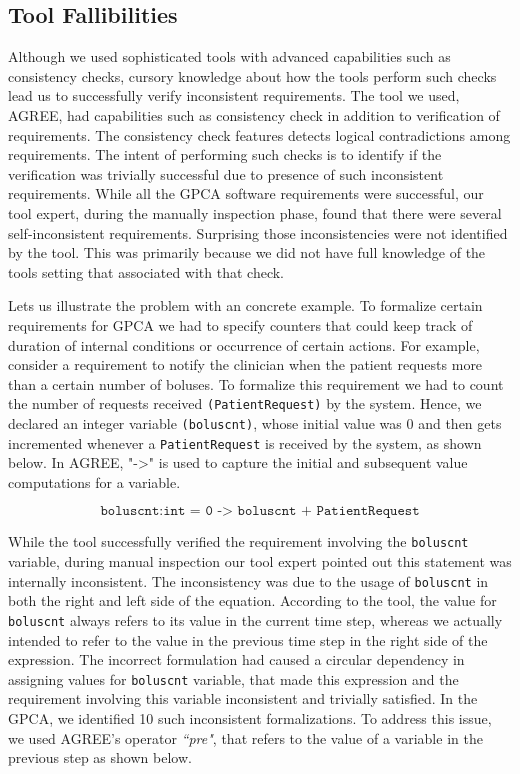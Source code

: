 \subsection{Tool Fallibilities}

Although we used sophisticated tools with advanced capabilities such as consistency checks, cursory knowledge about how the tools perform such checks lead us to successfully verify inconsistent requirements. The tool we used, AGREE, had capabilities such as consistency check in addition to verification of requirements. The consistency check features detects logical contradictions among requirements. The intent of performing such checks is to identify if the verification was trivially successful due to presence of such inconsistent requirements. While all the GPCA software requirements were successful, our tool expert, during the manually inspection phase, found that there were several self-inconsistent requirements. Surprising those inconsistencies were not identified by the tool. This was primarily because we did not have full knowledge of the tools setting that associated with that check.

Lets us illustrate the problem with an concrete example. To formalize certain requirements for GPCA we had to specify counters that could keep track of duration of internal conditions or occurrence of certain actions. For example, consider a requirement to notify the clinician when the patient requests more than a certain number of boluses. To formalize this requirement we had to count the number of requests received \texttt{(PatientRequest)} by the system. Hence, we declared an integer variable \texttt{(boluscnt)}, whose initial value was 0 and then gets incremented whenever a \texttt{PatientRequest} is received by the system, as shown below. In AGREE, "->" is used to capture the initial and subsequent value computations for a variable.

$$ \texttt{boluscnt:int = 0 -> boluscnt + PatientRequest} $$

While the tool successfully verified the requirement involving the \texttt{boluscnt} variable, during manual inspection our tool expert pointed out this statement was internally inconsistent. The inconsistency was due to the usage of \texttt{boluscnt} in both the right and left side of the equation. According to the tool, the value for \texttt{boluscnt} always refers to its value in the current time step, whereas we actually intended to refer to the value in the previous time step in the right side of the expression. The incorrect formulation had caused a circular dependency in assigning values for \texttt{boluscnt} variable, that made this expression and the requirement involving this variable inconsistent and trivially satisfied. In the GPCA, we identified 10 such inconsistent formalizations. To address this issue, we used AGREE's operator \emph{``pre"}, that refers to the value of a variable in the previous step as shown below.

